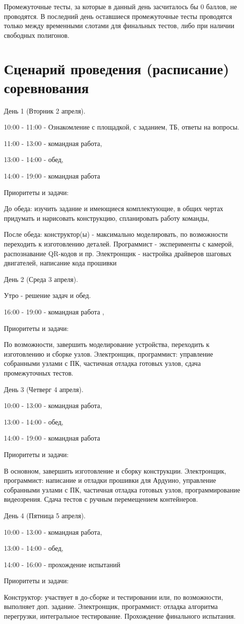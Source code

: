 Промежуточные тесты, за которые в данный день засчиталось бы 0 баллов, не проводятся.  В последний день оставшиеся промежуточные тесты проводятся только между временными слотами для финальных тестов, либо при наличии свободных полигонов.

\section{Сценарий проведения (расписание) соревнования}

День 1  (Вторник 2 апреля).

10:00 - 11:00  -  Ознакомление с площадкой, с заданием, ТБ, ответы на вопросы.

11:00 - 13:00 - командная работа, 

13:00 - 14:00 - обед,

14:00 - 19:00 - командная работа

Приоритеты и задачи:  

До обеда:  изучить задание и имеющиеся комплектующие, в общих чертах придумать и нарисовать конструкцию, спланировать работу команды, 

После обеда:  конструктор(ы) - максимально моделировать, по возможности переходить к изготовлению деталей.   Программист - эксперименты с камерой, распознавание QR-кодов и пр. Электронщик - настройка драйверов шаговых двигателей, написание кода прошивки

День 2  (Среда 3 апреля).

Утро - решение задач и обед.

16:00 - 19:00 - командная работа , 

Приоритеты и задачи:  

По возможности, завершить моделирование устройства, переходить к изготовлению и сборке узлов.  Электронщик, программист:  управление собранными узлами с ПК, частичная отладка готовых узлов, сдача промежуточных тестов.

День 3  (Четверг 4 апреля).

10:00 - 13:00 - командная работа, 

13:00 - 14:00 - обед,

14:00 - 19:00 - командная работа

Приоритеты и задачи:  

В основном, завершить изготовление и сборку конструкции.  Электронщик, программист:  написание и отладки прошивки для Ардуино, управление собранными узлами с ПК, частичная отладка готовых узлов, программирование видеозрения.  Сдача тестов с ручным перемещением контейнеров.

День 4  (Пятница 5 апреля).

10:00 - 13:00 - командная работа, 

13:00 - 14:00 - обед,

14:00 - 16:00 - прохождение испытаний

Приоритеты и задачи:  

Конструктор:  участвует в до-сборке и тестировании или, по возможности, выполняет доп. задание.  Электронщик, программист:  отладка алгоритма перегрузки, интегральное тестирование.  Прохождение финального испытания.